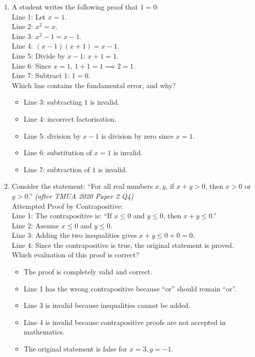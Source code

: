 \documentclass[11pt,a4paper]{article}
\begin{document}
\begin{enumerate}
\item A student writes the following proof that $1 = 0$:\\
Line 1: Let $x = 1$.\\
Line 2: $x^2 = x$.\\
Line 3: $x^2 - 1 = x - 1$.\\
Line 4: $(x-1)(x+1) = x - 1$.\\
Line 5: Divide by $x-1$: $x + 1 = 1$.\\
Line 6: Since $x = 1$, $1 + 1 = 1 \implies 2 = 1$.\\
Line 7: Subtract $1$: $1 = 0$.\\
Which line contains the fundamental error, and why?
\begin{itemize}
\item[A)] Line 3: subtracting $1$ is invalid.
\item[B)] Line 4: incorrect factorisation.
\item[C)] Line 5: division by $x-1$ is division by zero since $x=1$.
\item[D)] Line 6: substitution of $x=1$ is invalid.
\item[E)] Line 7: subtraction of $1$ is invalid.
\end{itemize}

\item Consider the statement: ``For all real numbers $x,y$, if $x+y > 0$, then $x > 0$ or $y > 0$.'' \textit{\small(after TMUA 2020 Paper 2 Q4)}\\
Attempted Proof by Contrapositive:\\
Line 1: The contrapositive is: ``If $x \le 0$ and $y \le 0$, then $x+y \le 0$.''\\
Line 2: Assume $x \le 0$ and $y \le 0$.\\
Line 3: Adding the two inequalities gives $x+y \le 0+0 = 0$.\\
Line 4: Since the contrapositive is true, the original statement is proved.\\
Which evaluation of this proof is correct?
\begin{itemize}
\item[A)] The proof is completely valid and correct.
\item[B)] Line 1 has the wrong contrapositive because ``or'' should remain ``or''.
\item[C)] Line 3 is invalid because inequalities cannot be added.
\item[D)] Line 4 is invalid because contrapositive proofs are not accepted in mathematics.
\item[E)] The original statement is false for $x=3, y=-1$.
\end{itemize}

\end{enumerate}

\end{document}
